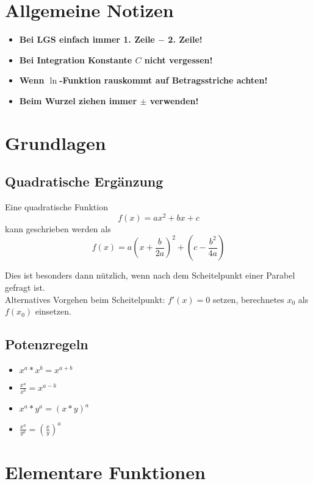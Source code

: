 \documentclass[12pt, a4paper]{scrreprt}
\begin{document}


\tableofcontents
\pagebreak

\chapter{Allgemeine Notizen}
\begin{itemize}
\item \textbf{Bei LGS einfach immer 1. Zeile \(-\) 2. Zeile!}
\item \textbf{Bei Integration Konstante \(C\) nicht vergessen!}
\item \textbf{Wenn \(\ln\)-Funktion rauskommt auf Betragsstriche achten!}
\item \textbf{Beim Wurzel ziehen immer \(\pm\) verwenden!}
\end{itemize}
\chapter{Grundlagen}
\section{Quadratische Ergänzung}

Eine quadratische Funktion
\[f(x)=ax^2+bx+c\]
kann geschrieben werden als
\[
  f(x)=a {\left (x+\frac{b}{2a} \right)}^2+ \left (c-\frac{b^2}{4a} \right)
\]

Dies ist besonders dann nützlich, wenn nach dem Scheitelpunkt einer Parabel gefragt ist.\\
Alternatives Vorgehen beim Scheitelpunkt: \(f'(x) = 0\) setzen, berechnetes \(x_0\) als \(f(x_0)\) einsetzen.

\section{Potenzregeln}

\begin{itemize}
\item \(x^a * x^b = x^{a+b}\)
\item \(\frac{x^a}{x^b} = x^{a-b}\)
\item \(x^a * y^a = {(x * y)}^a\)
\item \(\frac{x^a}{y^a} = {\left(\frac{x}{y}\right)}^a\)
\end{itemize}

\setcounter{chapter}{4}

\chapter{Elementare Funktionen}
\end{document}

